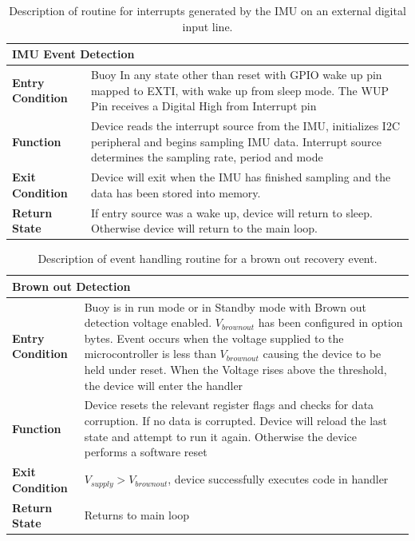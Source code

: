 \begin{table}[H]
    \centering
    \caption{Description of routine for interrupts generated by the IMU on an external digital input line.}
    \begin{tabular}{|m{}|m{}|}
    \hline
        \multicolumn{2}{|l|}{\textbf{IMU Event Detection}} \\
        \hline
       \textbf{Entry Condition}  & Buoy In any state other than reset with GPIO wake up pin mapped to EXTI, with wake up from sleep mode. The WUP Pin receives a Digital High from Interrupt pin\\
       \hline
      \textbf{Function} & Device reads the interrupt source from the IMU, initializes I2C peripheral and begins sampling IMU data. Interrupt source determines the sampling rate, period and mode\\
       \hline
       \textbf{Exit Condition} & Device will exit when the IMU has finished sampling and the data has been stored into memory.\\
       \hline
       \textbf{Return State} & If entry source was a wake up, device will return to sleep. Otherwise device will return to the main loop.\\
       \hline
    \end{tabular}

    \label{tab:Int_desc_IMU}
\end{table}

\begin{table}[H]
    \centering
    \caption{Description of event handling routine for a brown out recovery event.}
    \begin{tabular}{|m{}|m{}|}
    \hline
    \multicolumn{2}{|l|}{\textbf{Brown out Detection}} \\
    \hline
    \textbf{Entry Condition}  & Buoy is in run mode or in Standby mode with Brown out detection voltage enabled. $V_{brownout}$ has been configured in option bytes. Event occurs when the voltage supplied to the microcontroller is less than $V_{brownout}$  causing the device to be held under reset. When the Voltage rises above the threshold, the device will enter the handler \\
    \hline
    \textbf{Function} & Device resets the relevant register flags and checks for data corruption. If no data is corrupted. Device will reload the last state and attempt to run it again. Otherwise the device performs a software reset \\
    \hline
    \textbf{Exit Condition} & $V_{supply} > V_{brownout}$, device successfully executes code in handler \\
    \hline
    \textbf{Return State} & Returns to main loop\\
    \hline
    \end{tabular}
    \label{tab:Ev_desc_BoD}
\end{table}

